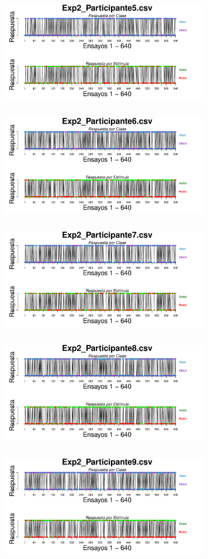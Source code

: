 \documentclass[a4paper ]{article}
\begin{document}
\begin{figure}[th]
\includegraphics[width=9cm, height=5cm]{Figures/BiasResp_Exp2_P5} \includegraphics[width=9cm, height=5cm]{Figures/BiasResp_Exp2_P6}
\includegraphics[width=9cm, height=5cm]{Figures/BiasResp_Exp2_P7} \includegraphics[width=9cm, height=5cm]{Figures/BiasResp_Exp2_P8} 
\includegraphics[width=9cm, height=5cm]{Figures/BiasResp_Exp2_P9}
\end{figure}
\end{document}
